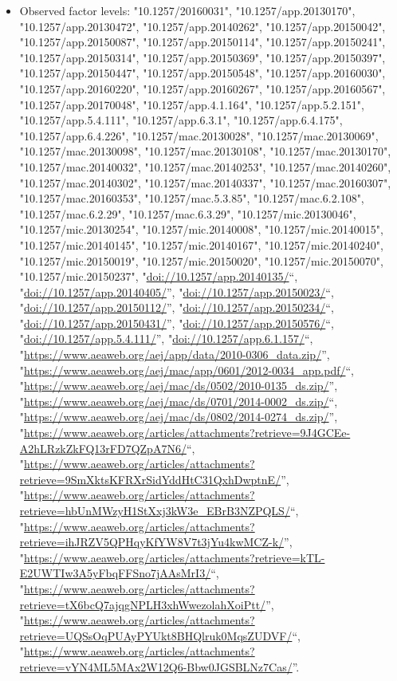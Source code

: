 \documentclass[]{article}
\providecommand{\tightlist}{%
  \setlength{\itemsep}{0pt}\setlength{\parskip}{0pt}}
\begin{document}
\begin{itemize}
\tightlist
\item
  Observed factor levels: "10.1257/20160031", "10.1257/app.20130170",
  "10.1257/app.20130472", "10.1257/app.20140262",
  "10.1257/app.20150042", "10.1257/app.20150087",
  "10.1257/app.20150114", "10.1257/app.20150241",
  "10.1257/app.20150314", "10.1257/app.20150369",
  "10.1257/app.20150397", "10.1257/app.20150447",
  "10.1257/app.20150548", "10.1257/app.20160030",
  "10.1257/app.20160220", "10.1257/app.20160267",
  "10.1257/app.20160567", "10.1257/app.20170048", "10.1257/app.4.1.164",
  "10.1257/app.5.2.151", "10.1257/app.5.4.111", "10.1257/app.6.3.1",
  "10.1257/app.6.4.175", "10.1257/app.6.4.226", "10.1257/mac.20130028",
  "10.1257/mac.20130069", "10.1257/mac.20130098",
  "10.1257/mac.20130108", "10.1257/mac.20130170",
  "10.1257/mac.20140032", "10.1257/mac.20140253",
  "10.1257/mac.20140260", "10.1257/mac.20140302",
  "10.1257/mac.20140337", "10.1257/mac.20160307",
  "10.1257/mac.20160353", "10.1257/mac.5.3.85", "10.1257/mac.6.2.108",
  "10.1257/mac.6.2.29", "10.1257/mac.6.3.29", "10.1257/mic.20130046",
  "10.1257/mic.20130254", "10.1257/mic.20140008",
  "10.1257/mic.20140015", "10.1257/mic.20140145",
  "10.1257/mic.20140167", "10.1257/mic.20140240",
  "10.1257/mic.20150019", "10.1257/mic.20150020",
  "10.1257/mic.20150070", "10.1257/mic.20150237",
  "\url{doi://10.1257/app.20140135/}``,
  "\url{doi://10.1257/app.20140405/}'',
  "\url{doi://10.1257/app.20150023/}``,
  "\url{doi://10.1257/app.20150112/}'',
  "\url{doi://10.1257/app.20150234/}``,
  "\url{doi://10.1257/app.20150431/}'',
  "\url{doi://10.1257/app.20150576/}``,
  "\url{doi://10.1257/app.5.4.111/}'',
  "\url{doi://10.1257/app.6.1.157/}``,
  "\url{https://www.aeaweb.org/aej/app/data/2010-0306_data.zip/}'',
  "\url{https://www.aeaweb.org/aej/mac/app/0601/2012-0034_app.pdf/}``,
  "\url{https://www.aeaweb.org/aej/mac/ds/0502/2010-0135_ds.zip/}'',
  "\url{https://www.aeaweb.org/aej/mac/ds/0701/2014-0002_ds.zip/}``,
  "\url{https://www.aeaweb.org/aej/mac/ds/0802/2014-0274_ds.zip/}'',
  "\url{https://www.aeaweb.org/articles/attachments?retrieve=9J4GCEe-A2hLRzkZkFQ13rFD7QZpA7N6/}``,
  "\url{https://www.aeaweb.org/articles/attachments?retrieve=9SmXktsKFRXrSidYddHtC31QxhDwptnE/}'',
  "\url{https://www.aeaweb.org/articles/attachments?retrieve=hbUnMWzyH1StXxj3kW3e_EBrB3NZPQLS/}``,
  "\url{https://www.aeaweb.org/articles/attachments?retrieve=ihJRZV5QPHqyKfYW8V7t3jYu4kwMCZ-k/}'',
  "\url{https://www.aeaweb.org/articles/attachments?retrieve=kTL-E2UWTIw3A5yFbqFFSno7jAAsMrI3/}``,
  "\url{https://www.aeaweb.org/articles/attachments?retrieve=tX6bcQ7ajqgNPLH3xhWwezolahXoiPtt/}'',
  "\url{https://www.aeaweb.org/articles/attachments?retrieve=UQSsOqPUAyPYUkt8BHQlruk0MqsZUDVF/}``,
  "\url{https://www.aeaweb.org/articles/attachments?retrieve=vYN4ML5MAx2W12Q6-Bbw0JGSBLNz7Cas/}''.
\end{itemize}
\end{document}
